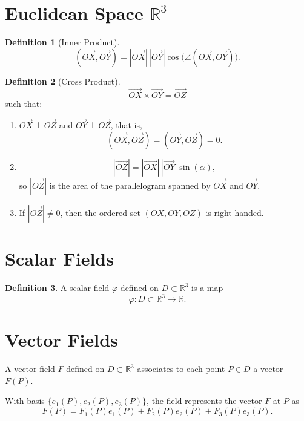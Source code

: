 \documentclass[11pt]{report}
\theoremstyle{definition}
\newtheorem{definition}{Definition}[chapter]
\theoremstyle{plain}
\theoremstyle{remark}
\newcommand{\R}{\mathbb{R}}
\newcommand{\ip}[2]{\left(#1,#2\right)}
\begin{document}
\section{Euclidean Space \texorpdfstring{$\mathbb{R}^3$}{R3}}

\begin{definition}[Inner Product]
\[
\ip{\overrightarrow{OX}}{\overrightarrow{OY}}
=
|\overrightarrow{OX}|\,|\overrightarrow{OY}|
\cos\bigl(\angle(\overrightarrow{OX},\overrightarrow{OY})\bigr).
\]
\end{definition}

\begin{definition}[Cross Product]
\[
\overrightarrow{OX}\times \overrightarrow{OY}=\overrightarrow{OZ}
\]
such that:
\begin{enumerate}
    \item $\overrightarrow{OX}\perp \overrightarrow{OZ}$ and $\overrightarrow{OY}\perp \overrightarrow{OZ}$, that is,
    \[
    \ip{\overrightarrow{OX}}{\overrightarrow{OZ}} = \ip{\overrightarrow{OY}}{\overrightarrow{OZ}} = 0.
    \]
    \item
    \[
    |\overrightarrow{OZ}| = |\overrightarrow{OX}|\,|\overrightarrow{OY}|\sin(\alpha),
    \]
    so $|\overrightarrow{OZ}|$ is the area of the parallelogram spanned by $\overrightarrow{OX}$ and $\overrightarrow{OY}$.
    \item If $|\overrightarrow{OZ}|\neq 0$, then the ordered set $(OX,OY,OZ)$ is right-handed.
\end{enumerate}
\end{definition}

\section{Scalar Fields}

\begin{definition}
A scalar field $\varphi$ defined on $D\subset \R^3$ is a map
\[
\varphi:D\subset \R^3\to \R.
\]
\end{definition}

\section{Vector Fields}

A vector field $F$ defined on $D\subset \R^3$ associates to each point $P\in D$ a vector $F(P)$.

With basis $\{e_1(P),e_2(P),e_3(P)\}$, the field represents the vector $F$ at $P$ as
\[
F(P)=F_1(P)e_1(P)+F_2(P)e_2(P)+F_3(P)e_3(P).
\]
\end{document}
